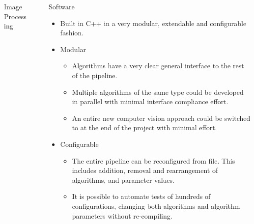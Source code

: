 \documentclass[final,hyperref={pdfpagelabels=false}]{beamer}
\begin{document}
\begin{frame}[t]
\begin{columns}[t]
\begin{column}{.465\textwidth}
\begin{block}{Image Processing}
\end{block}



\end{column} %

\begin{column}{.03\textwidth}\end{column} %
 
\begin{column}{.465\textwidth} %






\begin{block}{Software}
\begin{itemize}
	\item Built in C++ in a very modular, extendable and configurable fashion.
\end{itemize}
	\begin{itemize}
		\item Modular
		\begin{itemize}
			\item Algorithms have a very clear general interface to the rest of the pipeline.
			\item Multiple algorithms of the same type could be developed in parallel with minimal interface compliance effort.
			\item An entire new computer vision approach could be switched to at the end of the project with minimal effort.
		\end{itemize}
	\end{itemize}
	\begin{itemize}
		\item Configurable
	\begin{itemize}
		\item The entire pipeline can be reconfigured from file. This includes addition, removal and rearrangement of algorithms, and parameter values.
		\item It is possible to automate tests of hundreds of configurations, changing both algorithms and algorithm parameters without re-compiling.
	\end{itemize}
\end{itemize}
\end{block}


\end{column}
\end{columns}
\end{frame}
\end{document}
